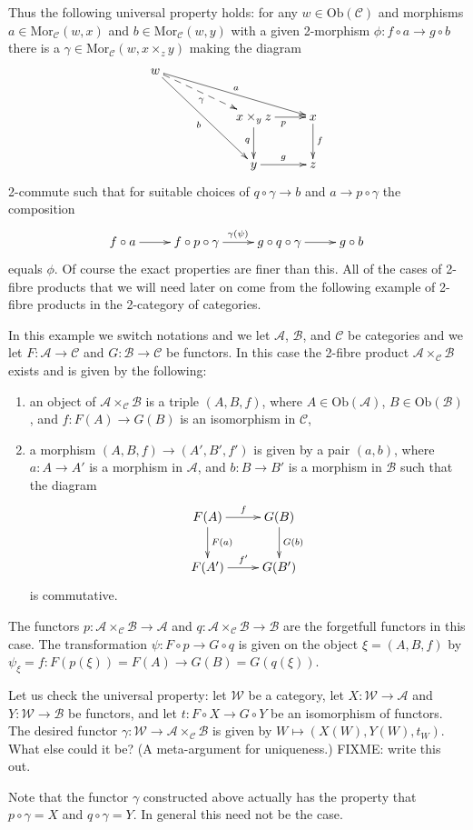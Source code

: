 \noindent
Thus the following universal property holds: for any
$w\in \text{Ob}(\mathcal{C})$ and morphisms 
$a \in \text{Mor}_{\mathcal C}(w,x)$ and 
$b \in \text{Mor}_{\mathcal{C}}(w,y)$ with a given 2-morphism
$\phi : f \circ a \to g\circ b$
there is a $\gamma \in \text{Mor}_{\mathcal C}(w,x\times_z y)$
making the diagram
$$
\xymatrix{
w\ar[rrrd]^a \ar@{-->}[rrd]_\gamma \ar[rrdd]_b &&\\
&&x\times_y z \ar[r]_{p} \ar[d]_{q} & x \ar[d]^{f} \\
&&y \ar[r]^{g} & z }
$$
2-commute such that for suitable choices of $q \circ \gamma \to b$
and $a \to p \circ \gamma$ the composition
$$
\xymatrix{
f \circ a \ar[r] &
f \circ p \circ \gamma \ar[r]^{\gamma(\psi)} &
g \circ q \circ \gamma \ar[r] &
g\circ b }
$$
equals $\phi$. Of course the exact properties are finer than this. All of the
cases of 2-fibre products that we will need later on come from the following
example of 2-fibre products in the 2-category of categories.

\begin{example}
\label{example-2-fibre-product-categories}
In this example we switch notations and we let $\mathcal{A}$, $\mathcal{B}$,
and $\mathcal{C}$ be categories and we let $F : \mathcal{A} \to \mathcal{C}$
and $G : \mathcal{B} \to \mathcal{C}$ be functors. In this case the 2-fibre
product $\mathcal{A}\times_\mathcal{C} \mathcal{B}$ exists and is given by
the following:
\begin{enumerate}
\item an object of $\mathcal{A}\times_\mathcal{C} \mathcal{B}$ is a triple
$(A,B,f)$, where $A\in \text{Ob}(\mathcal{A})$, $B\in \text{Ob}(\mathcal{B})$,
and $f : F(A) \to G(B)$ is an isomorphism in $\mathcal{C}$,
\item a morphism $(A,B,f) \to (A',B', f')$ is given by a pair $(a,b)$, where
$a : A \to A'$ is a morphism in $\mathcal{A}$, and $b : B \to B'$ is a
morphism in $\mathcal{B}$ such that the diagram 
$$
\xymatrix{
F(A) \ar[r]^f \ar[d]^{F(a)} & G(B) \ar[d]^{G(b)} \\
F(A') \ar[r]^{f'} & G(B')
}
$$
is commutative.
\end{enumerate}
The functors $p : \mathcal{A}\times_\mathcal{C}\mathcal{B} \to \mathcal{A}$
and $q : \mathcal{A}\times_\mathcal{C}\mathcal{B} \to \mathcal{B}$ are the
forgetfull functors in this case. The transformation $\psi : F \circ p \to
G \circ q$ is given on the object $\xi = (A,B,f)$ by
$\psi_\xi = f : F(p(\xi)) = F(A) \to G(B) = G(q(\xi))$.

\smallskip\noindent
Let us check the universal property: let $\mathcal{W}$ be a category, let
$X : \mathcal{W} \to \mathcal{A}$ and $Y : \mathcal{W} \to \mathcal{B}$ be
functors, and let $t : F \circ X \to G \circ Y$ be an isomorphism of functors.
The desired functor $\gamma : \mathcal{W} \to
\mathcal{A}\times_\mathcal{C}\mathcal{B}$
is given by $W \mapsto (X(W), Y(W), t_W)$. What else could it be? 
(A meta-argument for uniqueness.) FIXME: write this out.

\smallskip\noindent
Note that the functor $\gamma$ constructed above actually has the property
that $p \circ \gamma = X$ and $q \circ \gamma = Y$. In general this need not
be the case.
\end{example}

